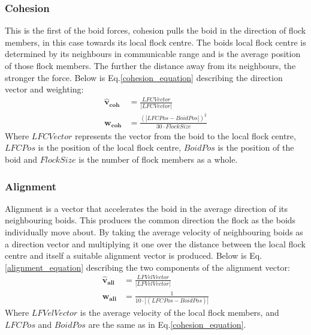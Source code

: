 \subsubsection{Cohesion} 
This is the first of the boid forces, cohesion pulls the boid in the direction of flock members, in this case towards its local flock centre. The boids local flock centre is determined by its neighbours in communicable range and is the average position of those flock members. The further the distance away from its neighbours, the stronger the force. Below is Eq.\ref{cohesion_equation} describing the direction vector and weighting:
\begin{equation}
\begin{split}
	\boldsymbol{\hat{v}_{coh}} &= \frac{ LFCVector} {|LFCVector|} \\
	\boldsymbol{w_{coh}} &= \frac{(|LFCPos - BoidPos|)^2} {30 \cdot FlockSize}
\end{split}
\label{cohesion_equation}
\end{equation}
Where $LFCVector$ represents the vector from the boid to the local flock centre, $LFCPos$ is the position of the local flock centre, $BoidPos$ is the position of the boid and $FlockSize$ is the number of flock members as a whole.


\subsubsection{Alignment}
Alignment is a vector that accelerates the boid in the average direction of its neighbouring boids. This produces the common direction the flock as the boids individually move about. By taking the average velocity of neighbouring boids as a direction vector and multiplying it one over the distance between the local flock centre and itself a suitable alignment vector is produced. Below is Eq.\ref{alignment_equation} describing the two components of the alignment vector:
\begin{equation}
\begin{split}
	\boldsymbol{\hat{v}_{ali}} &= \frac{ LFVelVector} {|LFVelVector|} \\
	\boldsymbol{w_{ali}} &= \frac{1} {10 \cdot |(LFCPos - BoidPos)|}
\end{split}
\label{alignment_equation}
\end{equation}
Where $LFVelVector$ is the average velocity of the local flock members, and $LFCPos$ and $BoidPos$ are the same as in Eq.\ref{cohesion_equation}.


